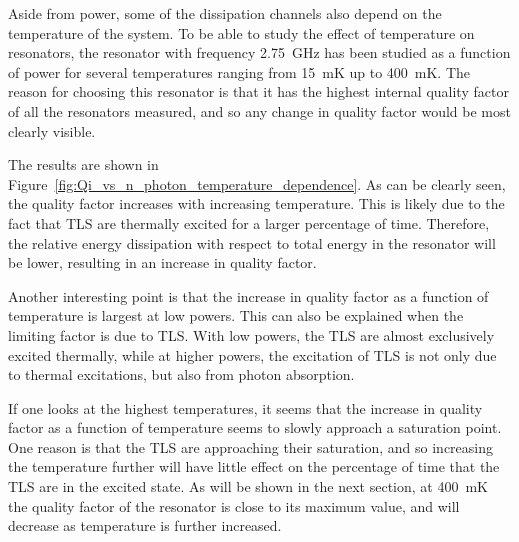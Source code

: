 Aside from power, some of the dissipation channels also depend on the temperature of the system. To be able to study the effect of temperature on resonators, the resonator with frequency \SI{2.75}{\giga \hertz} has been studied as a function of power for several temperatures ranging from \SI{15}{\milli \kelvin} up to \SI{400}{\milli \kelvin}. The reason for choosing this resonator is that it has the highest internal quality factor of all the resonators measured, and so any change in quality factor would be most clearly visible.

The results are shown in Figure~\ref{fig:Qi_vs_n_photon_temperature_dependence}. As can be clearly seen, the quality factor increases with increasing temperature. This is likely due to the fact that TLS are thermally excited for a larger percentage of time. Therefore, the relative energy dissipation with respect to total energy in the resonator will be lower, resulting in an increase in quality factor.

Another interesting point is that the increase in quality factor as a function of temperature is largest at low powers. This can also be explained when the limiting factor is due to TLS. With low powers, the TLS are almost exclusively excited thermally, while at higher powers, the excitation of TLS is not only due to thermal excitations, but also from photon absorption.

If one looks at the highest temperatures, it seems that the increase in quality factor as a function of temperature seems to slowly approach a saturation point. One reason is that the TLS are approaching their saturation, and so increasing the temperature further will have little effect on the percentage of time that the TLS are in the excited state. As will be shown in the next section, at \SI{400}{\milli \kelvin} the quality factor of the resonator is close to its maximum value, and will decrease as temperature is further increased.



